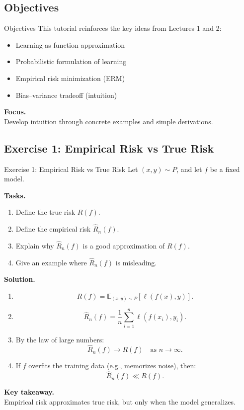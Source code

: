 \documentclass[aspectratio=169,11pt]{beamer}
\begin{document}
\subsection{Objectives}
\begin{frame}[t,allowframebreaks]{Objectives}
\small
This tutorial reinforces the key ideas from Lectures 1 and 2:
\begin{itemize}
    \item Learning as function approximation
    \item Probabilistic formulation of learning
    \item Empirical risk minimization (ERM)
    \item Bias--variance tradeoff (intuition)
\end{itemize}

\textbf{Focus.}\\ Develop intuition through concrete examples and simple derivations.
\end{frame}

\subsection{Exercise 1: Empirical Risk vs True Risk}
\begin{frame}[t,allowframebreaks]{Exercise 1: Empirical Risk vs True Risk}
\small
Let $(x,y) \sim P$, and let $f$ be a fixed model.

\textbf{Tasks.}\\ \begin{enumerate}
    \item Define the true risk $R(f)$.
    \item Define the empirical risk $\hat{R}_n(f)$.
    \item Explain why $\hat{R}_n(f)$ is a good approximation of $R(f)$.
    \item Give an example where $\hat{R}_n(f)$ is misleading.
\end{enumerate}

\textbf{Solution.}\\ \begin{enumerate}
    \item 
    \[
    R(f) = \mathbb{E}_{(x,y)\sim P}[\ell(f(x),y)].
    \]

    \item 
    \[
    \hat{R}_n(f) = \frac{1}{n} \sum_{i=1}^n \ell(f(x_i), y_i).
    \]

    \item By the law of large numbers:
    \[
    \hat{R}_n(f) \to R(f) \quad \text{as } n \to \infty.
    \]

    \item If $f$ overfits the training data (e.g., memorizes noise), then:
    \[
    \hat{R}_n(f) \ll R(f).
    \]
\end{enumerate}

\textbf{Key takeaway.}\\ Empirical risk approximates true risk, but only when the model generalizes.
\end{frame}
\end{document}
